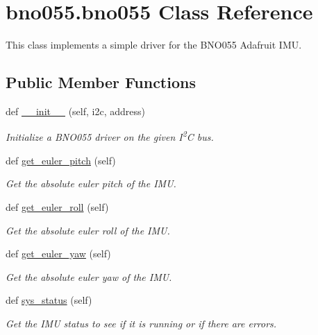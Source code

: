 \hypertarget{classbno055_1_1bno055}{}\section{bno055.\+bno055 Class Reference}
\label{classbno055_1_1bno055}


This class implements a simple driver for the B\+N\+O055 Adafruit I\+MU.  


\subsection*{Public Member Functions}
\begin{DoxyCompactItemize}
\item 
def \hyperlink{classbno055_1_1bno055_a6df2c1494372ae43c1f91374a9c2086d}{\+\_\+\+\_\+init\+\_\+\+\_\+} (self, i2c, address)
\begin{DoxyCompactList}\small\item\em Initialize a B\+N\+O055 driver on the given I\textsuperscript{2}C bus. \end{DoxyCompactList}\item 
def \hyperlink{classbno055_1_1bno055_ac40430cb358937db4ff3f0189d14e25d}{get\+\_\+euler\+\_\+pitch} (self)
\begin{DoxyCompactList}\small\item\em Get the absolute euler pitch of the I\+MU. \end{DoxyCompactList}\item 
def \hyperlink{classbno055_1_1bno055_a49aa987327ae1aaf68e95873b3bf8711}{get\+\_\+euler\+\_\+roll} (self)
\begin{DoxyCompactList}\small\item\em Get the absolute euler roll of the I\+MU. \end{DoxyCompactList}\item 
def \hyperlink{classbno055_1_1bno055_af21d62e91fdd3fb667fa29d8d43dfd1f}{get\+\_\+euler\+\_\+yaw} (self)
\begin{DoxyCompactList}\small\item\em Get the absolute euler yaw of the I\+MU. \end{DoxyCompactList}\item 
def \hyperlink{classbno055_1_1bno055_abd725ef3dc28867b8dbcd159debd90b3}{sys\+\_\+status} (self)
\begin{DoxyCompactList}\small\item\em Get the I\+MU status to see if it is running or if there are errors. \end{DoxyCompactList}\item 

\end{DoxyCompactItemize}
